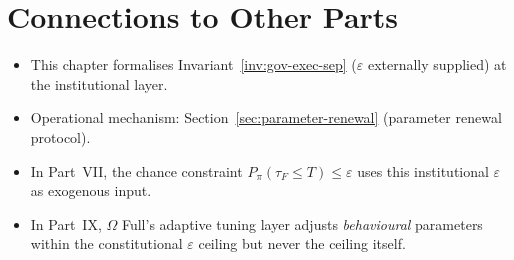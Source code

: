\section*{Connections to Other Parts}

\begin{itemize}
\item This chapter formalises Invariant~\ref{inv:gov-exec-sep}
($\varepsilon$ externally supplied) at the institutional layer.
\item Operational mechanism: Section~\ref{sec:parameter-renewal}
(parameter renewal protocol).
\item In Part~VII, the chance constraint $P_\pi(\tau_F \le T) \le
\varepsilon$ uses this institutional $\varepsilon$ as
exogenous input.
\item In Part~IX, $\Omega$ Full's adaptive tuning layer adjusts
\emph{behavioural} parameters within the constitutional
$\varepsilon$ ceiling but never the ceiling itself.
\end{itemize}
